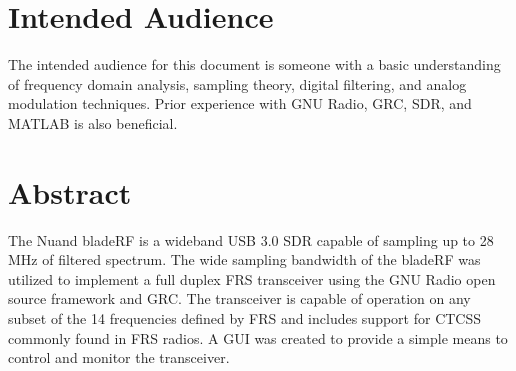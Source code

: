 \def \title{An SDR-based FRS Transceiver}
\def \subtitle{Prototyping a Multi-channel FRS Transceiver with CTCSS Support via GNU Radio and the Nuand bladeRF}

\def \authors{
  \begin{table}[h]
    \centering
    \begin{tabular}{ccc}
      Robert Ghilduta & Brian Padalino & Jon Szymaniak \\
      \href{mailto:robert.ghilduta@nuand.com?cc=bladeRF@nuand.com}{robert.ghilduta@nuand.com} & \href{mailto:bpadalino@nuand.com?cc=bladeRF@nuand.com}{bpadalino@nuand.com} & \href{mailto:jon@nuand.com?cc=bladeRF@nuand.com}{jon@nuand.com}
    \end{tabular}
  \end{table}
  ~\\
}

\def \tablerowcolor{\rowcolor[HTML]{C0C0C0}}
\def \tablecolcolor{\columncolor[HTML]{C0C0C0}}

\def \revisions {
  \begin{table}[h]
    \centering
    \begin{tabular}{|c|c|l|}
      \hline
      \tablerowcolor
      \textbf{Revision} & Date & \textbf{Summary} \hspace{4in}  \\ \hline
      1  & 2015-06-12 & Initial public draft \\ \hline
    \end{tabular}
  \end{table}
}





\whitepapercover
\docinfo

\section{Intended Audience}
The intended audience for this document is someone with a basic understanding
of frequency domain analysis, sampling theory, digital filtering, and analog
modulation techniques. Prior experience with GNU Radio, \ac{GRC}, \ac{SDR}, and
MATLAB is also beneficial.

\section{Abstract}
The Nuand bladeRF is a wideband USB 3.0 \ac{SDR} capable
of sampling up to 28 MHz of filtered spectrum.   The wide sampling
bandwidth of the bladeRF was utilized to implement a full duplex \ac{FRS} transceiver using
the GNU Radio open source framework and \ac{GRC}.  The transceiver is
capable of operation on any subset of the 14 frequencies defined by \ac{FRS}
and includes support for \ac{CTCSS} commonly found in \ac{FRS} radios. A GUI
was created to provide a simple means to control and monitor the transceiver.

